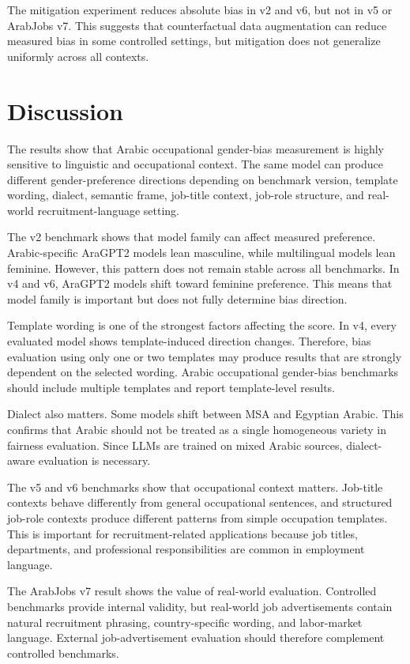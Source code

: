 \documentclass[conference]{IEEEtran}
\begin{document}
The mitigation experiment reduces absolute bias in v2 and v6, but not in v5 or ArabJobs v7. This suggests that counterfactual data augmentation can reduce measured bias in some controlled settings, but mitigation does not generalize uniformly across all contexts.

\section{Discussion}

The results show that Arabic occupational gender-bias measurement is highly sensitive to linguistic and occupational context. The same model can produce different gender-preference directions depending on benchmark version, template wording, dialect, semantic frame, job-title context, job-role structure, and real-world recruitment-language setting.

The v2 benchmark shows that model family can affect measured preference. Arabic-specific AraGPT2 models lean masculine, while multilingual models lean feminine. However, this pattern does not remain stable across all benchmarks. In v4 and v6, AraGPT2 models shift toward feminine preference. This means that model family is important but does not fully determine bias direction.

Template wording is one of the strongest factors affecting the score. In v4, every evaluated model shows template-induced direction changes. Therefore, bias evaluation using only one or two templates may produce results that are strongly dependent on the selected wording. Arabic occupational gender-bias benchmarks should include multiple templates and report template-level results.

Dialect also matters. Some models shift between MSA and Egyptian Arabic. This confirms that Arabic should not be treated as a single homogeneous variety in fairness evaluation. Since LLMs are trained on mixed Arabic sources, dialect-aware evaluation is necessary.

The v5 and v6 benchmarks show that occupational context matters. Job-title contexts behave differently from general occupational sentences, and structured job-role contexts produce different patterns from simple occupation templates. This is important for recruitment-related applications because job titles, departments, and professional responsibilities are common in employment language.

The ArabJobs v7 result shows the value of real-world evaluation. Controlled benchmarks provide internal validity, but real-world job advertisements contain natural recruitment phrasing, country-specific wording, and labor-market language. External job-advertisement evaluation should therefore complement controlled benchmarks.
\end{document}
